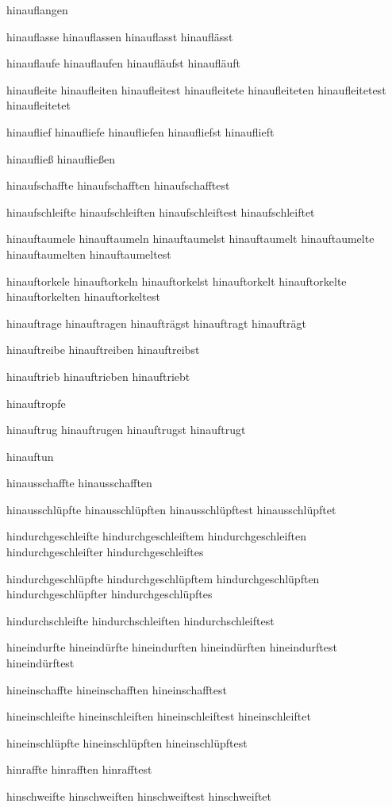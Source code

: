 hinauflangen

hinauflasse
hinauflassen
hinauflasst
hinauflässt

hinauflaufe
hinauflaufen
hinaufläufst
hinaufläuft

hinaufleite
hinaufleiten
hinaufleitest
hinaufleitete
hinaufleiteten
hinaufleitetest
hinaufleitetet

hinauflief
hinaufliefe
hinaufliefen
hinaufliefst
hinauflieft

hinaufließ
hinaufließen

hinaufschaffte
hinaufschafften
hinaufschafftest

hinaufschleifte
hinaufschleiften
hinaufschleiftest
hinaufschleiftet

hinauftaumele
hinauftaumeln
hinauftaumelst
hinauftaumelt
hinauftaumelte
hinauftaumelten
hinauftaumeltest

hinauftorkele
hinauftorkeln
hinauftorkelst
hinauftorkelt
hinauftorkelte
hinauftorkelten
hinauftorkeltest

hinauftrage
hinauftragen
hinaufträgst
hinauftragt
hinaufträgt

hinauftreibe
hinauftreiben
hinauftreibst

hinauftrieb
hinauftrieben
hinauftriebt

hinauftropfe

hinauftrug
hinauftrugen
hinauftrugst
hinauftrugt

hinauftun

hinausschaffte
hinausschafften

hinausschlüpfte
hinausschlüpften
hinausschlüpftest
hinausschlüpftet

hindurchgeschleifte
hindurchgeschleiftem
hindurchgeschleiften
hindurchgeschleifter
hindurchgeschleiftes

hindurchgeschlüpfte
hindurchgeschlüpftem
hindurchgeschlüpften
hindurchgeschlüpfter
hindurchgeschlüpftes

hindurchschleifte
hindurchschleiften
hindurchschleiftest

hineindurfte
hineindürfte
hineindurften
hineindürften
hineindurftest
hineindürftest

hineinschaffte
hineinschafften
hineinschafftest

hineinschleifte
hineinschleiften
hineinschleiftest
hineinschleiftet

hineinschlüpfte
hineinschlüpften
hineinschlüpftest

hinraffte
hinrafften
hinrafftest

hinschweifte
hinschweiften
hinschweiftest
hinschweiftet


